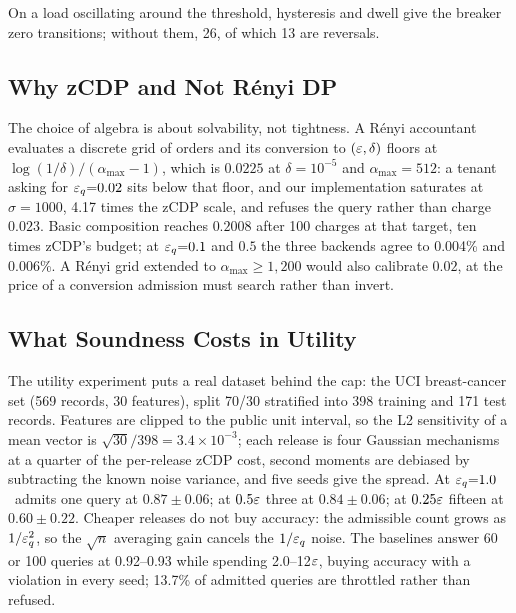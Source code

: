 On a load oscillating around the threshold, hysteresis and dwell give the breaker
zero transitions; without them, 26, of which 13 are reversals.

\subsection{Why zCDP and Not R\'enyi DP}
\label{sec:eval-backend}

The choice of algebra is about solvability, not tightness. A R\'enyi accountant
evaluates a discrete grid of orders and its conversion to $(\varepsilon,\delta)$ floors at
$\log(1/\delta)/(\alpha_{\max}-1)$, which is $0.0225$ at $\delta=10^{-5}$ and
$\alpha_{\max}{=}512$: a tenant asking for $\varepsilon_q{=}0.02$ sits below that floor, and
our implementation saturates at $\sigma{=}1000$, 4.17 times the zCDP scale, and refuses
the query rather than charge $0.023$. Basic composition reaches $0.2008$ after 100
charges at that target, ten times zCDP's budget; at $\varepsilon_q{=}0.1$ and $0.5$ the three
backends agree to 0.004\% and 0.006\%. A R\'enyi grid extended to
$\alpha_{\max}\ge1{,}200$ would also calibrate $0.02$, at the price of a conversion
admission must search rather than invert.

\subsection{What Soundness Costs in Utility}
\label{sec:eval-utility}

The utility experiment puts a real dataset behind the cap: the UCI breast-cancer set
(569 records, 30 features), split 70/30 stratified into 398 training and 171 test
records. Features are clipped to the public unit interval, so the L2 sensitivity of a
mean vector is $\sqrt{30}/398=3.4\times10^{-3}$; each release is four Gaussian
mechanisms at a quarter of the per-release zCDP cost, second moments are debiased by
subtracting the known noise variance, and five seeds give the spread. At $\varepsilon_q{=}1.0$ \sys\ admits one query at $0.87\pm0.06$; at
$0.5\varepsilon$ three at $0.84\pm0.06$; at $0.25\varepsilon$ fifteen at $0.60\pm0.22$. Cheaper releases do not buy accuracy: the admissible count grows as $1/\varepsilon_q^2$, so
the $\sqrt{n}$ averaging gain cancels the $1/\varepsilon_q$ noise. The baselines answer 60 or
100 queries at 0.92--0.93 while spending 2.0--12$\varepsilon$, buying accuracy with a violation
in every seed; 13.7\% of admitted queries are throttled rather than refused.
